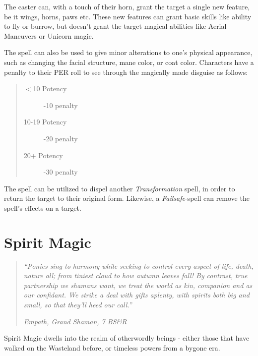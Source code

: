 \documentclass[11pt,a4paper,twocolumn]{book}
\begin{document}
The caster can, with a touch of their horn, grant the target a single new feature, be it wings, horns, paws etc. These new features can grant basic skills like ability to fly or burrow, but doesn't grant the target magical abilities like Aerial Maneuvers or Unicorn magic.

The spell can also be used to give minor alterations to one's physical appearance, such as changing the facial structure, mane color, or coat color. Characters have a penalty to their PER roll to see through the magically made disguise as follows:

\begin{quote}
	\begin{description}
		\item[$<$10 Potency] 	-10 penalty
		\item[10-19 Potency] 	-20 penalty
		\item[20+ Potency] 		-30 penalty
	\end{description}
\end{quote}

The spell can be utilized to dispel another \textit{Transformation} spell, in order to return the target to their original form. Likewise, a \textit{Failsafe}-spell can remove the spell's effects on a target.

\vfill


\chapter{Spirit Magic}


\begin{quote}
	\emph{``Ponies sing to harmony while seeking to control every aspect of life, death, nature all; from tiniest cloud to how autumn leaves fall! By contrast, true partnership we shamans want, we treat the world as kin, companion and as our confidant. We strike a deal with gifts aplenty, with spirits both big and small, so that they'll heed our call.''}
	
	\emph{ Empath, Grand Shaman, 7 BS\&R}
\end{quote}

Spirit Magic dwells into the realm of otherwordly beings - either those that have walked on the Wasteland before, or timeless powers from a bygone era. 
\end{document}
